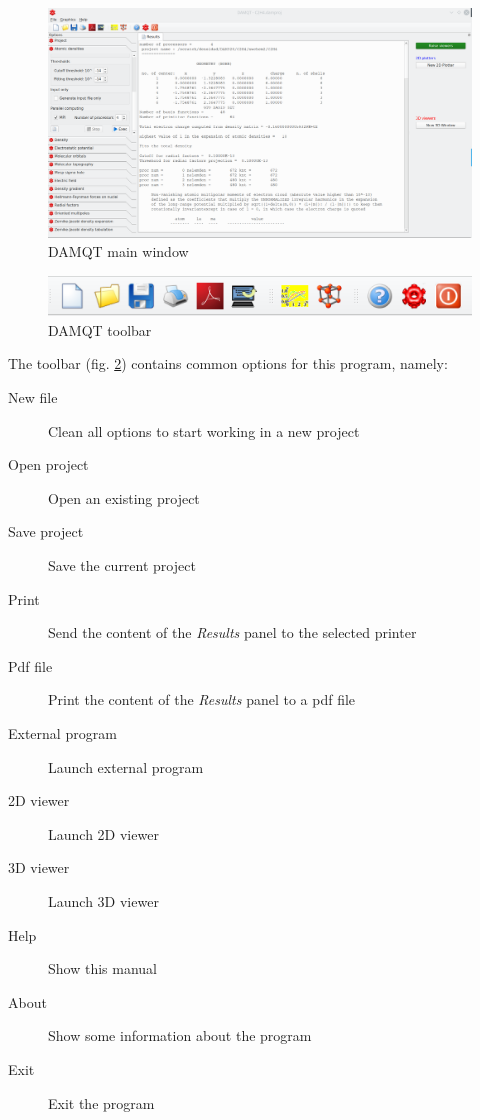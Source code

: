 \documentclass[10pt]{article}
\begin{document}
\vspace*{0cm}
\begin{figure}[H]
\begin{center}
\includegraphics[width=0.5\linewidth]{damqt320_main_panel.png}
\end{center}
\caption{{DAMQT} main window \label{fig:2_1}}
\end{figure}

\vspace*{0cm}
\begin{figure}[H]
\begin{center}
\includegraphics[width=0.5\linewidth]{damqt320_toolbar.png}
\end{center}
\caption{{DAMQT} toolbar \label{fig:2_2}}
\end{figure}

The toolbar (fig. \ref{fig:2_2}) contains common options for this
program, namely:


\begin{description}
 \item[\bigtoolbN New file] Clean all options to start working in a new project
 \item[\bigtoolbA Open project] Open an existing  project
 \item[\bigtoolbS Save project] Save the current project
 \item[\bigtoolbP Print] Send the content of the {\it Results} panel to the
selected printer
 \item[\bigtoolbD Pdf file] Print the content of the {\it Results} panel to a pdf
file
 \item[\bigtoolbE External program] Launch external program
 \item[\bigtoolbC 2D viewer] Launch 2D viewer
 \item[\bigtoolbV 3D viewer] Launch 3D viewer
 \item[\bigtoolbH Help] Show this manual
 \item[\bigtoolbB About] Show some information about the program
 \item[\bigtoolbQ Exit] Exit the program
\end{description} 
\end{document}
